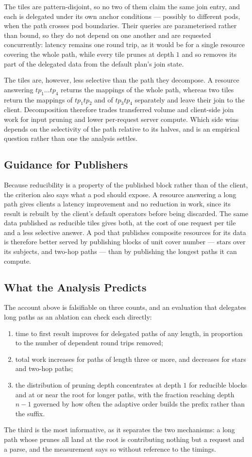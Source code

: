 The tiles are pattern-disjoint, so no two of them claim the same join entry, and each is
delegated under its own anchor conditions --- possibly to different pods, when the path
crosses pod boundaries. Their queries are parameterised rather than bound, so they do not
depend on one another and are requested concurrently: latency remains one round trip, as
it would be for a single resource covering the whole path, while every tile prunes at
depth $1$ and so removes its part of the delegated data from the default plan's join
state.

The tiles are, however, less selective than the path they decompose. A resource answering
$tp_1 \dots tp_4$ returns the mappings of the whole path, whereas two tiles return the
mappings of $tp_1 tp_2$ and of $tp_3 tp_4$ separately and leave their join to the client.
Decomposition therefore trades transferred volume and client-side join work for input
pruning and lower per-request server compute. Which side wins depends on the selectivity
of the path relative to its halves, and is an empirical question rather than one the
analysis settles.

\subsection{Guidance for Publishers}

Because reducibility is a property of the published block rather than of the client, the
criterion also says what a pod should expose. A resource answering a long path gives
clients a latency improvement and no reduction in work, since its result is rebuilt by
the client's default operators before being discarded. The same data published as
reducible tiles gives both, at the cost of one request per tile and a less selective
answer. A pod that publishes composite resources for its data is therefore better served
by publishing blocks of unit cover number --- stars over its subjects, and two-hop paths
--- than by publishing the longest paths it can compute.

\subsection{What the Analysis Predicts}

The account above is falsifiable on three counts, and an evaluation that delegates long
paths as an ablation can check each directly:

\begin{enumerate}
\item time to first result improves for delegated paths of any length, in proportion to
      the number of dependent round trips removed;
\item total work increases for paths of length three or more, and decreases for stars and
      two-hop paths;
\item the distribution of pruning depth concentrates at depth $1$ for reducible blocks and
      at or near the root for longer paths, with the fraction reaching depth $n-1$
      governed by how often the adaptive order builds the prefix rather than the suffix.
\end{enumerate}

The third is the most informative, as it separates the two mechanisms: a long path whose
prunes all land at the root is contributing nothing but a request and a parse, and the
measurement says so without reference to the timings.
